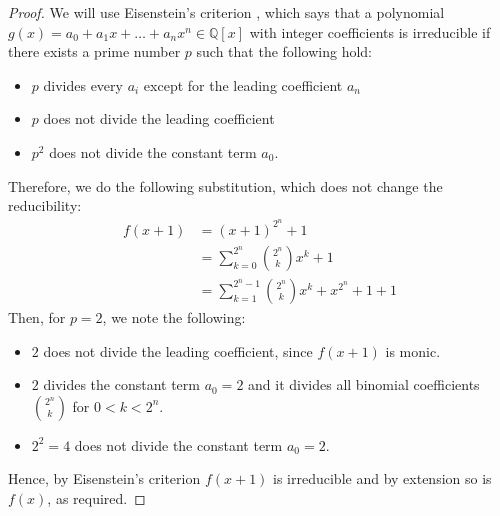 \documentclass{article}
\theoremstyle{definition}
\theoremstyle{example}
\newcommand{\Rat}{\mathbb{Q}}
\begin{document}
\begin{proof}
  We will use Eisenstein's criterion \cite{eisenstein_1850}, which says that a
  polynomial $g(x) = a_0 + a_1x + \hdots + a_nx^n \in \Rat[x]$ with integer coefficients is irreducible if there
  exists a prime number $p$ such that the following hold:
  \begin{itemize}
  \item $p$ divides every $a_i$ except for the leading coefficient $a_n$
  \item $p$ does not divide the leading coefficient
  \item $p^2$ does not divide the constant term $a_0$.
  \end{itemize}
  Therefore, we do the following substitution, which does not change the
  reducibility:
  \begin{align*}
    f(x + 1) &= (x + 1)^{2^n} + 1\\
             &= \sum_{k = 0}^{2^n} \binom{2^n}{k} x^k + 1 \\
             &= \sum_{k = 1}^{2^n - 1} \binom{2^n}{k} x^k + x^{2^n} + 1 + 1
  \end{align*}
  Then, for $p = 2$, we note the following:
  \begin{itemize}
    \item $2$ does not divide the leading coefficient, since $f(x+1)$ is monic.
    \item $2$ divides the constant term $a_0 = 2$ and it divides all binomial
      coefficients $\binom{2^n}{k}$ for $0 < k < 2^n$.
    \item $2^2 = 4$ does not divide the constant term $a_0 = 2$.
  \end{itemize}
  Hence, by Eisenstein's criterion $f(x + 1)$ is irreducible and by extension so
  is $f(x)$, as required.
\end{proof}
\printbibliography
\end{document}
